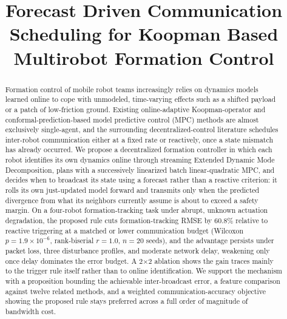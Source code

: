 \documentclass[10pt,conference]{IEEEtran}
\begin{document}
\renewcommand{\arraystretch}{0.92}

\title{Forecast Driven Communication Scheduling for Koopman Based Multirobot Formation Control}

\author{
}

\maketitle

\begin{abstract}
Formation control of mobile robot teams increasingly relies on dynamics models learned online to cope with unmodeled, time-varying effects such as a shifted payload or a patch of low-friction ground. Existing online-adaptive Koopman-operator and conformal-prediction-based model predictive control (MPC) methods are almost exclusively single-agent, and the surrounding decentralized-control literature schedules inter-robot communication either at a fixed rate or reactively, once a state mismatch has already occurred. We propose a decentralized formation controller in which each robot identifies its own dynamics online through streaming Extended Dynamic Mode Decomposition, plans with a successively linearized batch linear-quadratic MPC, and decides when to broadcast its state using a forecast rather than a reactive criterion: it rolls its own just-updated model forward and transmits only when the predicted divergence from what its neighbors currently assume is about to exceed a safety margin. On a four-robot formation-tracking task under abrupt, unknown actuation degradation, the proposed rule cuts formation-tracking RMSE by 60.8\% relative to reactive triggering at a matched or lower communication budget (Wilcoxon $p=1.9\times10^{-6}$, rank-biserial $r=1.0$, $n=20$ seeds), and the advantage persists under packet loss, three disturbance profiles, and moderate network delay, weakening only once delay dominates the error budget. A 2$\times$2 ablation shows the gain traces mainly to the trigger rule itself rather than to online identification. We support the mechanism with a proposition bounding the achievable inter-broadcast error, a feature comparison against twelve related methods, and a weighted communication-accuracy objective showing the proposed rule stays preferred across a full order of magnitude of bandwidth cost.
\end{abstract}
\end{document}
